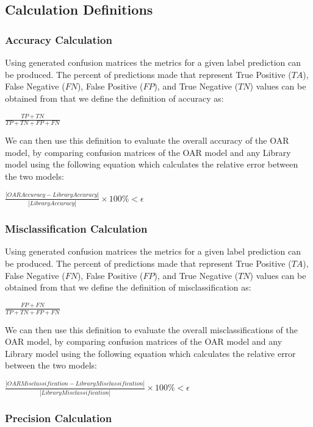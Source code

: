\documentclass[12pt, titlepage]{article}
\begin{document}
\subsection{Calculation Definitions}

\subsubsection{Accuracy Calculation} \label{accuracy_calc}

Using generated confusion matrices the metrics for a given label prediction can be produced. The percent of predictions made
that represent True Positive ($TA$), False Negative ($FN$), False Positive ($FP$), and True Negative ($TN$) values can be obtained 
from that we define the definition of accuracy as:

$\frac{TP + TN}{TP + TN + FP + FN}$

We can then use this definition to evaluate the overall accuracy of the OAR model, by comparing confusion matrices of the OAR model 
and any Library model using the following equation which calculates the relative error between the two models:

$\frac{|OAR Accuracy - Library Accuracy|}{|Library Accuracy|} \times 100\% < \epsilon$

\subsubsection{Misclassification Calculation} \label{misclass_calc}

Using generated confusion matrices the metrics for a given label prediction can be produced. The percent of predictions made
that represent True Positive ($TA$), False Negative ($FN$), False Positive ($FP$), and True Negative ($TN$) values can be obtained 
from that we define the definition of misclassification as:

$\frac{FP + FN}{TP + TN + FP + FN}$

We can then use this definition to evaluate the overall misclassifications of the OAR model, by comparing confusion matrices of the OAR model 
and any Library model using the following equation which calculates the relative error between the two models:

$\frac{|OAR Misclassification - Library Misclassification|}{|Library Misclassification|} \times 100\% < \epsilon$

\subsubsection{Precision Calculation} \label{precision_calc}
\end{document}
